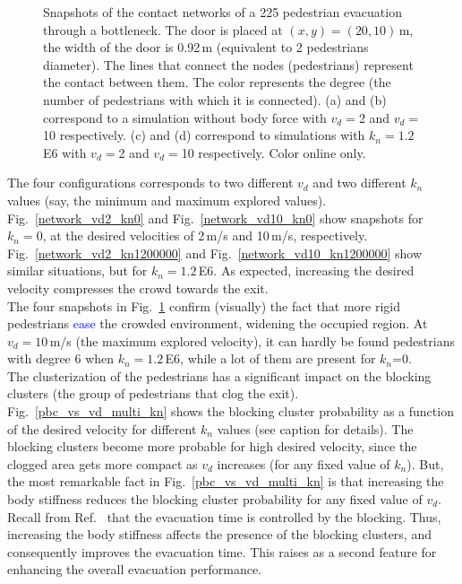 \documentclass[preprint,12pt]{elsarticle}
\begin{document}
\begin{figure}[!htbp]
\caption[width=0.47\columnwidth]{Snapshots of the contact networks of a 225 pedestrian evacuation through a bottleneck. The door is placed at $(x,y)=(20,10)\,$m, the width of the door is 0.92$\,$m (equivalent to 2 pedestrian\textsc{}s diameter). The lines that connect the nodes (pedestrians) represent the contact between them. The color represents the degree (the number of pedestrians with which it is connected). (a) and (b) correspond to a simulation without body force with $v_d=$2 and $v_d=$10 respectively. (c) and (d) correspond to simulations with $k_n=1.2\,$E6 with $v_d=$2 and $v_d=$10 respectively. Color online only.}
\label{network_bottleneck}
\end{figure}



The four configurations corresponds to two different $v_d$ and two different $k_n$ values (say, the  minimum and maximum explored values). Fig.~\ref{network_vd2_kn0} and Fig.~\ref{network_vd10_kn0} show snapshots for $k_n=0$, at the desired velocities of 2$\,$m/s and 10$\,$m/s, respectively.    Fig.~\ref{network_vd2_kn1200000} and Fig.~\ref{network_vd10_kn1200000} show similar situations, but for  $k_n=1.2\,$E6. As expected, increasing the desired velocity compresses the crowd towards the exit. \\

The four snapshots in Fig.~\ref{network_bottleneck} confirm (visually) the fact that more rigid pedestrians \textcolor{blue}{ease} the crowded environment, widening the occupied region. At $v_d=10\,$m/s (the maximum explored velocity), it can hardly be found pedestrians with degree 6 when $k_n=1.2\,$E6, while a lot of them are present for $k_n$=0.\\

The clusterization of the pedestrians has a significant impact on the blocking clusters (the group of pedestrians that clog the exit).  Fig.~\ref{pbc_vs_vd_multi_kn} shows the blocking cluster probability as a function of the desired velocity for different $k_n$ values (see caption for details). The blocking clusters become more probable for high desired velocity, since the clogged area gets more compact as $v_d$ increases (for any fixed value of $k_n$). But, the most remarkable fact in Fig.~\ref{pbc_vs_vd_multi_kn} is that increasing the body stiffness reduces the blocking cluster probability for any fixed value of $v_d$. Recall from Ref.~\cite{dorso_2005} that the evacuation time is controlled by the blocking. Thus, increasing the body stiffness affects the presence of the blocking clusters, and consequently improves the evacuation time. This raises as a second feature for enhancing the overall evacuation performance. \\
\end{document}
